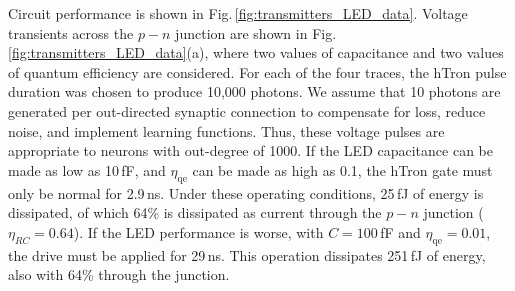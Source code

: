 \documentclass[twocolumn]{article}
\begin{document}
Circuit performance is shown in Fig.\,\ref{fig:transmitters_LED_data}. Voltage transients across the $p-n$ junction are shown in Fig. \ref{fig:transmitters_LED_data}(a), where two values of capacitance and two values of quantum efficiency are considered. For each of the four traces, the hTron pulse duration was chosen to produce 10,000 photons. We assume that 10 photons are generated per out-directed synaptic connection to compensate for loss, reduce noise, and implement learning functions. Thus, these voltage pulses are appropriate to neurons with out-degree of 1000. If the LED capacitance can be made as low as 10\,fF, and $\eta_{\mathrm{qe}}$ can be made as high as 0.1, the hTron gate must only be normal for 2.9\,ns. Under these operating conditions, 25\,fJ of energy is dissipated, of which 64\% is dissipated as current through the $p-n$ junction ($\eta_{RC}=0.64$). If the LED performance is worse, with $C = 100$\,fF and $\eta_{\mathrm{qe}} = 0.01$, the drive must be applied for 29\,ns. This operation dissipates 251\,fJ of energy, also with 64\% through the junction.
\end{document}
